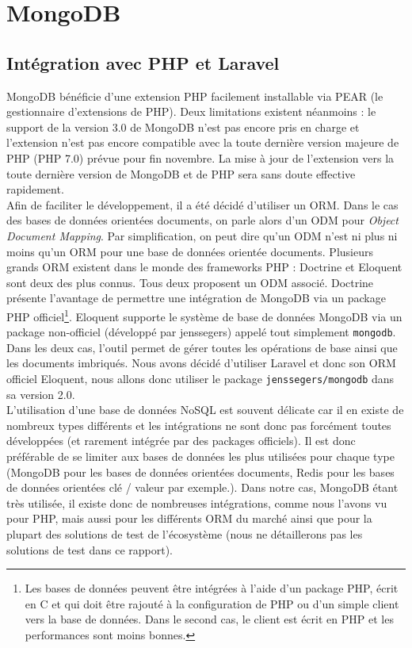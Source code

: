 \section{MongoDB} %
\label{sec:mongodb}

	\subsection{Intégration avec PHP et Laravel}%
	\label{sub:integration_avec_php_et_laravel}

		MongoDB bénéficie d'une extension PHP facilement installable via PEAR (le gestionnaire d'extensions de PHP). Deux limitations existent néanmoins : le support de la version 3.0 de MongoDB n'est pas encore pris en charge et l'extension n'est pas encore compatible avec la toute dernière version majeure de PHP (PHP 7.0) prévue pour fin novembre. La mise à jour de l'extension vers la toute dernière version de MongoDB et de PHP sera sans doute effective rapidement.\\

		Afin de faciliter le développement, il a été décidé d'utiliser un ORM. Dans le cas des bases de données orientées documents, on parle alors d'un ODM pour \textit{Object Document Mapping}. Par simplification, on peut dire qu'un ODM n'est ni plus ni moins qu'un ORM pour une base de données orientée documents. Plusieurs grands ORM existent dans le monde des frameworks PHP : Doctrine et Eloquent sont deux des plus connus. Tous deux proposent un ODM associé. Doctrine présente l'avantage de permettre une intégration de MongoDB via un package PHP officiel\footnote{Les bases de données peuvent être intégrées à l'aide d'un package PHP, écrit en C et qui doit être rajouté à la configuration de PHP ou d'un simple client vers la base de données. Dans le second cas, le client est écrit en PHP et les performances sont moins bonnes.}. Eloquent supporte le système de base de données MongoDB via un package non-officiel (développé par jenssegers) appelé tout simplement \verb|mongodb|. Dans les deux cas, l'outil permet de gérer toutes les opérations de base ainsi que les documents imbriqués. Nous avons décidé d'utiliser Laravel et donc son ORM officiel Eloquent, nous allons donc utiliser le package \verb|jenssegers/mongodb| dans sa version 2.0.\\

		L'utilisation d'une base de données NoSQL est souvent délicate car il en existe de nombreux types différents et les intégrations ne sont donc pas forcément toutes développées (et rarement intégrée par des packages officiels). Il est donc préférable de se limiter aux bases de données les plus utilisées pour chaque type (MongoDB pour les bases de données orientées documents, Redis pour les bases de données orientées clé / valeur par exemple.). Dans notre cas, MongoDB étant très utilisée, il existe donc de nombreuses intégrations, comme nous l'avons vu pour PHP, mais aussi pour les différents ORM du marché ainsi que pour la plupart des solutions de test de l'écosystème (nous ne détaillerons pas les solutions de test dans ce rapport).

